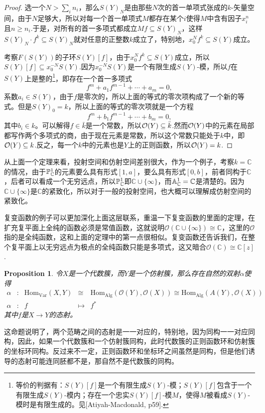 \documentclass[9pt]{extarticle}
\theoremstyle{plain}%
\newtheorem{pro}[defi]{Proposition}%
\begin{document}
\begin{proof}
	选一个$N>\sum_i n_i$，那么$S(Y)_N$是由那些$N$次的首一单项式张成的$k$-矢量空间，由于$N$足够大，所以对每一个首一单项式$M$都存在某个$i$使得$M$中含有因子$x^n_i$且$n\geq n_i$.于是，对所有的首一多项式都成立$Mf\subseteq S(Y)_N$，这样$S(Y)_N\cdot f^k\subseteq S(Y)_N$就对任意的正整数$k$成立了，特别地，$x_0^Nf^k\subseteq S(Y)$成立。

	考察$F(S(Y))$的子环$S(Y)[f]$，由于$x_0^Nf^k\subseteq S(Y)$成立，所以$S(Y)[f]\subseteq x_0^{-N}S(Y)$.因为$x_0^{-N}S(Y)$是一个有限生成$S(Y)$-模，所以$f$在$S(Y)$上是整的\footnote{等价的判据有：$S(Y)[f]$是一个有限生成$S(Y)$-模；$S(Y)[f]$包含于一个有限生成$S(Y)$-模内；存在一个忠实$S(Y)[f]$-模$M$，使得$M$被看成$S(Y)$-模时是有限生成的。见[Atiyah-Macdonald, p59].}，即存在一个首一多项式
	\[
		f^m+a_1f^{m-1}+\cdots+a_m=0,
	\]
	系数$a_i\in S(Y)$，由于$f$是零次的，所以上面的等式的零次项构成了一个新的等式。但是$S(Y)_0=k$，所以上面的等式的零次项就是一个方程
	\[
		f^m+b_1f^{m-1}+\cdots+b_m=0,
	\]
	其中$b_i\in k$。可以解得$f\in \bar{k}$是一个常数，所以$\mathcal{O}(Y)\subseteq \bar{k}$.然而$\mathcal{O}(Y)$中的元素在局部都写作两个多项式的商，由于现在元素是常数，所以这个常数只能处于$k$中，即$\mathcal{O}(Y)\subseteq k$.反之，每一个$k$中的元素也是$Y$上的正则函数，所以$\mathcal{O}(Y)= k$.
\end{proof}

从上面一个定理来看，投射空间和仿射空间差别很大，作为一个例子，考察$k=\mathbb{C}$的情况，由于$\mathbb{P}^1_{\mathbb{C}}$的元素要么具有形式$[1,a]$，要么具有形式$[0,b]$，前者同构于$\mathbb{C}$，后者可以看成一个无穷远点，所以$\mathbb{P}^1_{\mathbb{C}}$即$\mathbb{C}\cup \{\infty\}$，而$\mathbb{A}^1_{\mathbb{C}}=\mathbb{C}$是清楚的。因为$\mathbb{C}\cup \{\infty\}$是$\mathbb{C}$的紧致化，所以对于一般的投射空间，也大概可以理解成仿射空间的紧致化。

复变函数的例子可以更加深化上面这层联系，重温一下复变函数的里面的定理，在扩充复平面上全纯的函数必须是常值函数，这就说明$\mathcal{O}(\mathbb{C}\cup \{\infty\})\cong \mathbb{C}$，这里的$\mathcal{O}$指的是全纯函数，这和上面的定理中的第一点很相似。复变函数还告诉我们，在整个复平面上以无穷远点为极点的全纯函数只能是多项式，这又暗合$\mathcal{O}(\mathbb{C})\cong \mathbb{C}[z]$.

\begin{pro}
令$X$是一个代数簇，而$Y$是一个仿射簇，那么存在自然的双射$\alpha$使得
\[
\begin{array}{lcccl}
	\alpha&:&\mathrm{Hom}_{\mathrm{Var}}(X,Y)&\cong& \mathrm{Hom}_{\mathrm{Alg}}(\mathcal{O}(Y),\mathcal{O}(X))\cong \mathrm{Hom}_{\mathrm{Alg}}(A(Y),\mathcal{O}(X))\\
	\alpha&:&f&\mapsto &f^*
\end{array}
\]
其中$f$是$X\to Y$的态射。
\label{c3:p14}
\end{pro}
这命题说明了，两个范畴之间的态射是一一对应的，特别地，因为同构一一对应同构，因此，如果一个代数簇和一个仿射簇同构，此时代数簇的正则函数环和仿射簇的坐标环同构。反过来不一定，正则函数环和坐标环之间虽然是同构，但是他们诱导的态射可能连同胚都不是，那自然不是代数簇的同构。
\end{document}
